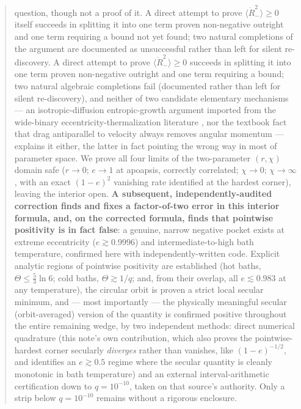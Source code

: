 \documentclass[12pt]{amsart}
\theoremstyle{plain}
\theoremstyle{remark}
\begin{document}
\begin{abstract}
question, though not a proof of it. A direct attempt to prove $\langle\dot R_-^2\rangle\geq0$ itself succeeds in splitting it into one term proven non-negative outright and one term requiring a bound not yet found; two natural completions of the argument are documented as unsuccessful rather than left for silent re-discovery. A direct attempt to prove $\langle\dot R_-^2\rangle\geq0$ succeeds in splitting it into one term proven non-negative outright and one term requiring a bound; two natural algebraic completions fail (documented rather than left for silent re-discovery), and neither of two candidate elementary mechanisms --- an isotropic-diffusion entropic-growth argument imported from the wide-binary eccentricity-thermalization literature \cite{HamiltonModak2024}, nor the textbook fact that drag antiparallel to velocity always removes angular momentum --- explains it either, the latter in fact pointing the wrong way in most of parameter space. We prove all four limits of the two-parameter $(r,\chi)$ domain safe ($r\to0$; $e\to1$ at apoapsis, correctly correlated; $\chi\to0$; $\chi\to\infty$, with an exact $(1-e)^2$ vanishing rate identified at the hardest corner), leaving the interior open. \textbf{A subsequent, independently-audited correction finds and fixes a factor-of-two error in this interior formula, and, on the corrected formula, finds that pointwise positivity is in fact false}: a genuine, narrow negative pocket exists at extreme eccentricity ($e\gtrsim0.9996$) and intermediate-to-high bath temperature, confirmed here with independently-written code. Explicit analytic regions of pointwise positivity are established (hot baths, $\Theta\leq\tfrac53\ln6$; cold baths, $\Theta\gtrsim1/q$; and, from their overlap, all $e\lesssim0.983$ at any temperature), the circular orbit is proven a strict local secular minimum, and --- most importantly --- the physically meaningful secular (orbit-averaged) version of the quantity is confirmed positive throughout the entire remaining wedge, by two independent methods: direct numerical quadrature (this note's own contribution, which also proves the pointwise-hardest corner secularly \emph{diverges} rather than vanishes, like $(1-e)^{-1/2}$, and identifies an $e\gtrsim0.5$ regime where the secular quantity is cleanly monotonic in bath temperature) and an external interval-arithmetic certification down to $q=10^{-10}$, taken on that source's authority. Only a strip below $q=10^{-10}$ remains without a rigorous enclosure.
\end{abstract}
\end{document}

